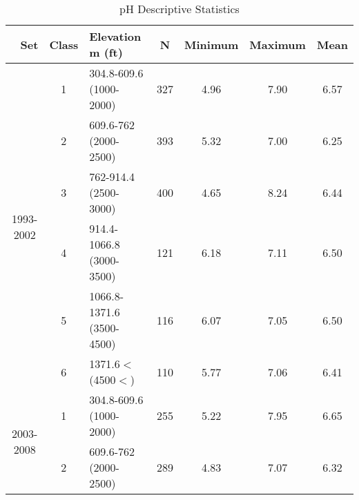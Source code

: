 \begin{table}[htbp]
  \centering
	\caption{pH Descriptive Statistics}
    \begin{tabular}{rrlcccc}
    \toprule
    Set                                                                                                                                     & Class                           & Elevation m (ft)                                                 & N     & Minimum & Maximum & Mean \\
    \midrule
    \multicolumn{1}{c}{\multirow{6}[2]{*}{\begin{sideways}1993-2002\end{sideways}}} & \multicolumn{1}{c}{1} & \multicolumn{1}{l}{304.8-609.6 (1000-2000)} & 327   & 4.96  & 7.90  & 6.57  \\
    \multicolumn{1}{c}{}                                                                                                         & \multicolumn{1}{c}{2} & \multicolumn{1}{l}{609.6-762 (2000-2500)}    & 393   & 5.32  & 7.00  & 6.25  \\
    \multicolumn{1}{c}{}                                                                                                         & \multicolumn{1}{c}{3} & \multicolumn{1}{l}{762-914.4 (2500-3000)} & 400   & 4.65  & 8.24  & 6.44  \\
    \multicolumn{1}{c}{}                                                                                                         & \multicolumn{1}{c}{4} & \multicolumn{1}{l}{914.4-1066.8 (3000-3500)} & 121   & 6.18  & 7.11  & 6.50  \\
    \multicolumn{1}{c}{}                                                                                                         & \multicolumn{1}{c}{5} & \multicolumn{1}{l}{1066.8-1371.6 (3500-4500)} & 116   & 6.07  & 7.05  & 6.50  \\
    \multicolumn{1}{c}{}                                                                                                         & \multicolumn{1}{c}{6} & \multicolumn{1}{l}{1371.6$<$ (4500$<$)} & 110   & 5.77  & 7.06  & 6.41  \\
\midrule
    \multicolumn{1}{c}{\multirow{6}[2]{*}{\begin{sideways}2003-2008\end{sideways}}} & \multicolumn{1}{c}{1} & \multicolumn{1}{l}{304.8-609.6 (1000-2000)} & 255   & 5.22  & 7.95  & 6.65  \\
    \multicolumn{1}{c}{}                                                                                                         & \multicolumn{1}{c}{2} & \multicolumn{1}{l}{609.6-762 (2000-2500)} & 289   & 4.83  & 7.07  & 6.32  \\

\end{tabular}
\end{table}
